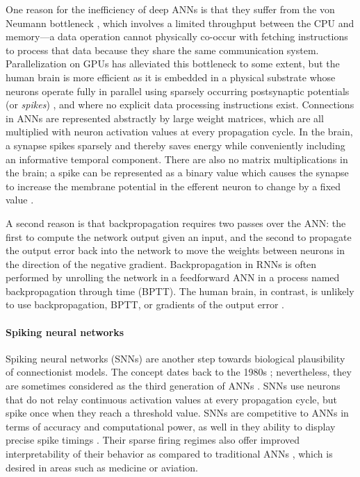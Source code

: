 One reason for the inefficiency of deep ANNs is that they suffer from the von Neumann bottleneck \citep{zenke2021brain}, which involves a limited throughput between the CPU and memory---a data operation cannot physically co-occur with fetching instructions to process that data because they share the same communication system.
Parallelization on GPUs has alleviated this bottleneck to some extent, but the human brain is more efficient as it is embedded in a physical substrate whose neurons operate fully in parallel \citep{a2017parallel} using sparsely occurring postsynaptic potentials (or \emph{spikes}) \citep{bear2020neuroscience}, and where no explicit data processing instructions exist.
Connections in ANNs are represented abstractly by large weight matrices, which are all multiplied with neuron activation values at every propagation cycle.
In the brain, a synapse spikes sparsely and thereby saves energy while conveniently including an informative temporal component.
There are also no matrix multiplications in the brain; a spike can be represented as a binary value which causes the synapse to increase the membrane potential in the efferent neuron to change by a fixed value \citep{bear2020neuroscience}.

A second reason is that backpropagation requires two passes over the ANN: the first to compute the network output given an input, and the second to propagate the output error back into the network to move the weights between neurons in the direction of the negative gradient.
Backpropagation in RNNs is often performed by unrolling the network in a feedforward ANN in a process named backpropagation through time (BPTT).
The human brain, in contrast, is unlikely to use backpropagation, BPTT, or gradients of the output error \citep{lillicrap2019backpropagation}.

\paragraph{Spiking neural networks}
Spiking neural networks (SNNs) \citep{maass1997networks,gerstner2002spiking} are another step towards biological plausibility of connectionist models.
The concept dates back to the 1980s \citep{hopfield1982neural}; nevertheless, they are sometimes considered as the third generation of ANNs \citep{maass1997networks}.
SNNs use neurons that do not relay continuous activation values at every propagation cycle, but spike once when they reach a threshold value.
SNNs are competitive to ANNs in terms of accuracy and computational power, as well in they ability to display precise spike timings \citep{lobo2020spiking}.
Their sparse firing regimes also offer improved interpretability of their behavior as compared to traditional ANNs \cite{soltic2010knowledge}, which is desired in areas such as medicine or aviation.


